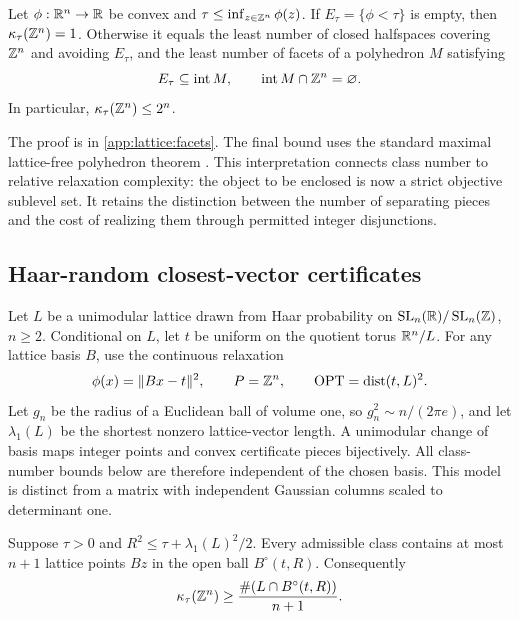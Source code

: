 \begin{theorem}
\label{lattice:facet-number}
Let $\phi:\mathbb{R}^n\to\mathbb{R}$ be convex and
$\tau\le\inf_{z\in\mathbb{Z}^n}\phi(z)$. If $E_\tau=\{\phi<\tau\}$ is empty,
then $\kappa_\tau(\mathbb{Z}^n)=1$. Otherwise it equals the least number of closed
halfspaces covering $\mathbb{Z}^n$ and avoiding $E_\tau$, and the least number of
facets of a polyhedron $M$ satisfying
\begin{equation}
 E_\tau\subseteq\operatorname{int}M,
 \qquad\operatorname{int}M\cap\mathbb{Z}^n=\varnothing.
 \label{lattice:enclosing-polyhedron}
\end{equation}
In particular, $\kappa_\tau(\mathbb{Z}^n)\le2^n$.
\end{theorem}

The proof is in \cref{app:lattice:facets}. The final bound uses the standard
maximal lattice-free polyhedron theorem
\citep{basuConfortiCornuejolsZambelli2010MaximalLatticeFree}. This interpretation connects
class number to relative relaxation complexity: the object to be enclosed
is now a strict objective sublevel set. It retains the distinction between
the number of separating pieces and the cost of realizing them through
permitted integer disjunctions.

\subsection{Haar-random closest-vector certificates}

Let $L$ be a unimodular lattice drawn from Haar probability on
$\operatorname{SL}_n(\mathbb{R})/\operatorname{SL}_n(\mathbb{Z})$, $n\ge2$. Conditional
on $L$, let $t$ be uniform on the quotient torus $\mathbb{R}^n/L$. For any lattice
basis $B$, use the continuous relaxation
\begin{equation}
 \phi(x)=\|Bx-t\|^2,
 \qquad P=\mathbb{Z}^n,
 \qquad\operatorname{OPT}=\operatorname{dist}(t,L)^2.
 \label{lattice:cvp-model}
\end{equation}
Let $g_n$ be the radius of a Euclidean ball of volume one, so
$g_n^2\sim n/(2\pi e)$, and let $\lambda_1(L)$ be the shortest nonzero
lattice-vector length. A unimodular change of basis maps integer points and
convex certificate pieces bijectively. All class-number bounds below are
therefore independent of the chosen basis. This model is distinct from a
matrix with independent Gaussian columns scaled to determinant one.

\begin{lemma}
\label{lattice:cap}
Suppose $\tau>0$ and $R^2\le\tau+\lambda_1(L)^2/2$. Every admissible
class contains at most $n+1$ lattice points $Bz$ in the open ball
$B^\circ(t,R)$. Consequently
\begin{equation}
 \kappa_\tau(\mathbb{Z}^n)\ge
 \frac{\#(L\cap B^\circ(t,R))}{n+1}.
 \label{lattice:cap-count}
\end{equation}
\end{lemma}

